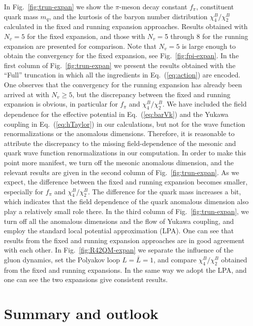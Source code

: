 \documentclass[%
reprint,
superscriptaddress,
showpacs,preprintnumbers,
 amsmath,amssymb,
 aps,
prd,
]{revtex4-1}
\def\Fig#1{Fig.~\ref{#1}} \def\Tab#1{Tab.~\ref{#1}}
\def\Eq#1{Eq.~(\ref{#1})}
\begin{document}
In \Fig{fig:trun-expan} we show the $\pi$-meson decay constant $f_\pi$, constituent quark mass $m_q$, and the kurtosis of the baryon number distribution $\chi_4^{B}/\chi_2^{B}$ calculated in the fixed and running expansion approaches. Results obtained with $N_v=5$ for the fixed expansion, and those with $N_v=$5 through 8 for the running expansion are presented for comparison. Note that $N_v=5$ is large enough to obtain the convergency for the fixed expansion, see \Fig{fig:fpi-expan}. In the first column of \Fig{fig:trun-expan} we present the results obtained with the ``Full'' truncation in which all the ingredients in \Eq{eq:action} are encoded.  One observes that the convergency for the running expansion has already been arrived at with $N_v\geq 5$, but the discrepancy between the fixed and running expansion is obvious, in particular for $f_\pi$ and $\chi_4^{B}/\chi_2^{B}$. We have included the field dependence for the effective potential in \Eq{eq:barVk} and the Yukawa coupling in \Eq{eq:hTaylor} in our calculations, but not for the wave function renormalizations or the anomalous dimensions. Therefore, it is reasonable to attribute the discrepancy to the missing field-dependence of the mesonic and quark wave function renormalizations in our computation. In order to make this point more manifest, we turn off the mesonic anomalous dimension, and the relevant results are given in the second column of \Fig{fig:trun-expan}. As we expect, the difference between the fixed and running expansion becomes smaller, especially for $f_\pi$ and $\chi_4^{B}/\chi_2^{B}$. The difference for the quark mass increases a bit, which indicates that the field dependence of the quark anomalous dimension also play a relatively small role there. In the third column of \Fig{fig:trun-expan}, we turn off all the anomalous dimensions and the flow of Yukawa coupling, and employ the standard local potential approximation (LPA). One can see that results from the fixed and running expansion approaches are in good agreement with each other. In \Fig{fig:R42QM-expan} we separate the influence of the gluon dynamics, set the Polyakov loop $L=\bar L=1$, and compare $\chi_4^{B}/\chi_2^{B}$ obtained from the fixed and running expansions. In the same way we adopt the LPA, and one can see the two expansions give consistent results.

\section{Summary and outlook}
\label{sec:sum}
\end{document}
